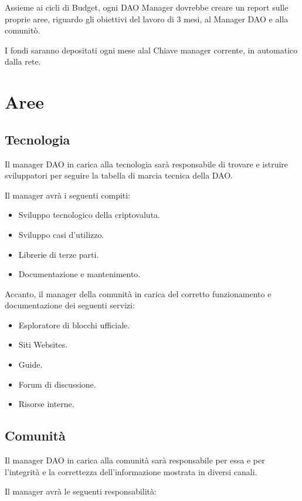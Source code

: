 \documentclass{article}
\begin{document}
Assieme ai cicli di Budget, ogni DAO Manager dovrebbe creare un report sulle proprie aree, riguardo gli obiettivi del lavoro di 3 mesi, al Manager DAO e alla comunitò.

I fondi saranno depositati ogni mese alal Chiave manager corrente, in automatico dalla rete.

\section{Aree}

\subsection{Tecnologia}

Il manager DAO in carica alla tecnologia sarà responsabile di trovare e istruire sviluppatori per seguire la tabella di marcia tecnica della DAO.

Il manager avrà i seguenti compiti:

\begin{itemize}
  \item Sviluppo tecnologico della criptovaluta.
  \item Sviluppo casi d'utilizzo.
  \item Librerie di terze parti.
  \item Documentazione e mantenimento.
\end{itemize}

Accanto, il manager della comunità in carica del corretto funzionamento e documentazione dei seguenti servizi:

\begin{itemize}
  \item Esploratore di blocchi ufficiale.
  \item Siti Websites.
  \item Guide.
  \item Forum di discussione.
  \item Risorse interne.
\end{itemize}

\subsection{Comunità}

Il manager DAO in carica alla comunità sarà responsabile per essa e per l'integrità e la correttezza dell'informazione mostrata in diversi canali. 

Il manager avrà le seguenti responsabilità:
\end{document}
